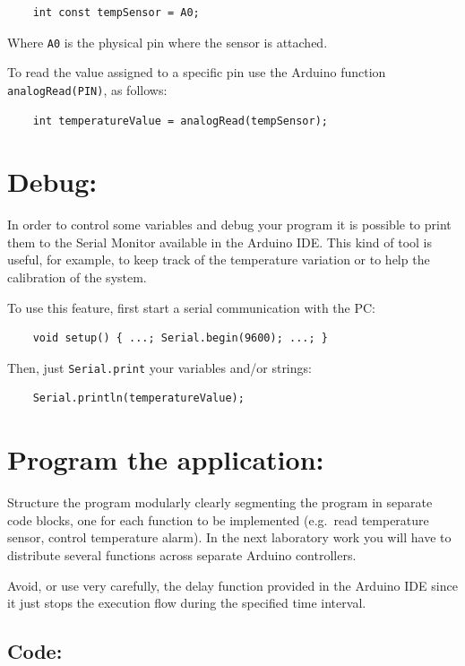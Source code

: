 \documentclass[10pt]{article}
\begin{document}
\begin{verbatim}
    int const tempSensor = A0;
\end{verbatim}

Where \texttt{A0} is the physical pin where the sensor is attached.

To read the value assigned to a specific pin use the Arduino function
\texttt{analogRead(PIN)}, as follows:

\begin{verbatim}
    int temperatureValue = analogRead(tempSensor);
\end{verbatim}

\section{Debug:}
In order to control some variables and debug your program it is possible to print them to the Serial Monitor available in the Arduino IDE. This kind of tool is useful, for example, to keep track of the temperature variation or to help the calibration of the system.

To use this feature, first start a serial communication with the PC:

\begin{verbatim}
    void setup() { ...; Serial.begin(9600); ...; }
\end{verbatim}

Then, just \texttt{Serial.print} your variables and/or strings:
\begin{verbatim}
    Serial.println(temperatureValue);
\end{verbatim}



\section{Program the application:}


Structure the program modularly clearly segmenting the program in separate code
blocks, one for each function to be implemented (e.g.\ read temperature sensor,
control temperature alarm).  In the next laboratory work you will have to
distribute several functions across separate Arduino controllers.

Avoid, or use very carefully, the delay function provided in the Arduino IDE since it just stops the execution flow during the specified time interval.

\subsection{Code:}
\end{document}
